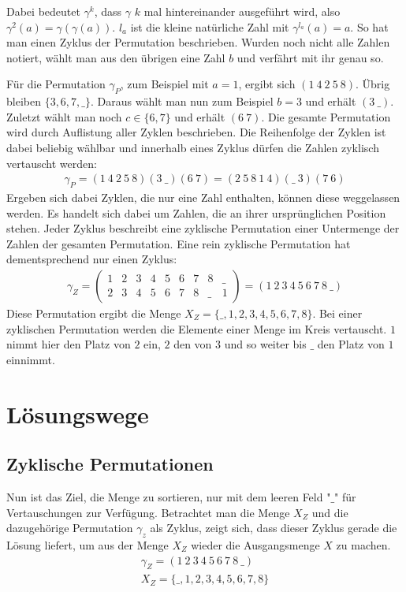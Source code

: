 \documentclass{fh-ium-bama}
\begin{document}
Dabei bedeutet $\gamma^k$, dass $\gamma$ $k$ mal hintereinander ausgeführt wird, also $\gamma^2(a) = \gamma(\gamma(a))$. $l_a$ ist die kleine natürliche Zahl mit $\gamma^{l_a}(a) = a$. So hat man einen Zyklus der Permutation beschrieben. Wurden noch nicht alle Zahlen notiert, wählt man aus den übrigen eine Zahl $b$ und verfährt mit ihr genau so.

Für die Permutation $\gamma_P$, zum Beispiel mit $a = 1$, ergibt sich $(1 ~ 4 ~ 2 ~ 5 ~ 8)$. Übrig bleiben $\{3, 6, 7, \_\}$. Daraus wählt man nun zum Beispiel $b = 3$ und erhält $(3 ~ \_)$. Zuletzt wählt man noch $c \in \{6, 7\}$ und erhält $(6 ~ 7)$. Die gesamte Permutation wird durch Auflistung aller Zyklen beschrieben. Die Reihenfolge der Zyklen ist dabei beliebig wählbar und innerhalb eines Zyklus dürfen die Zahlen zyklisch vertauscht werden:
\begin{gather*}
\gamma_P =
(1 ~ 4 ~ 2 ~ 5 ~ 8)(3 ~ \_)(6 ~ 7) =
(2 ~ 5 ~ 8 ~ 1 ~ 4)(\_ ~ 3)(7 ~ 6)
\end{gather*}
Ergeben sich dabei Zyklen, die nur eine Zahl enthalten, können diese weggelassen werden. Es handelt sich dabei um Zahlen, die an ihrer ursprünglichen Position stehen.
\newpage
Jeder Zyklus beschreibt eine zyklische Permutation einer Untermenge der Zahlen der gesamten Permutation. Eine rein zyklische Permutation hat dementsprechend nur einen Zyklus:
\begin{gather*}
\gamma_Z =
\begin{pmatrix}
	1 & 2 & 3 & 4 & 5 & 6 & 7 & 8 & \_ \\
	2 & 3 & 4 & 5 & 6 & 7 & 8 & \_ & 1
\end{pmatrix}
=
(1 ~ 2 ~ 3 ~ 4 ~ 5 ~ 6 ~ 7 ~ 8 ~ \_)
\end{gather*}
Diese Permutation ergibt die Menge $X_Z = \{\_, 1, 2, 3, 4, 5, 6, 7, 8\}$.
Bei einer zyklischen Permutation werden die Elemente einer Menge im Kreis vertauscht. $1$ nimmt hier den Platz von $2$ ein, $2$ den von $3$ und so weiter bis $\_$ den Platz von $1$ einnimmt.
	
\section{Lösungswege}
\subsection{Zyklische Permutationen}
Nun ist das Ziel, die Menge zu sortieren, nur mit dem leeren Feld "$\_$" für Vertauschungen zur Verfügung. Betrachtet man die Menge $X_Z$ und die dazugehörige Permutation $\gamma_z$ als Zyklus, zeigt sich, dass dieser Zyklus gerade die Lösung liefert, um aus der Menge $X_Z$ wieder die Ausgangsmenge $X$ zu machen.
\begin{gather*}
\gamma_Z = (1 ~ 2 ~ 3 ~ 4 ~ 5 ~ 6 ~ 7 ~ 8 ~ \_)\\
X_Z = \{\_, 1, 2, 3, 4, 5, 6, 7, 8\}
\end{gather*}
\end{document}
